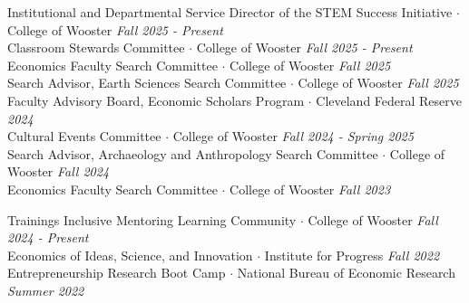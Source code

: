 \documentclass{resume} %
\begin{document}
\begin{rSection}{Institutional and Departmental Service}
	Director of the STEM Success Initiative $\cdot$ College of Wooster \hfill {\em Fall 2025 - Present} \\
	Classroom Stewards Committee $\cdot$ College of Wooster \hfill {\em Fall 2025 - Present} \\
	Economics Faculty Search Committee $\cdot$ College of Wooster \hfill {\em Fall 2025} \\
	Search Advisor, Earth Sciences Search Committee $\cdot$ College of Wooster \hfill {\em Fall 2025} \\
	Faculty Advisory Board, Economic Scholars Program $\cdot$ Cleveland Federal Reserve \hfill {\em 2024} \\
	Cultural Events Committee $\cdot$ College of Wooster \hfill {\em Fall 2024 - Spring 2025} \\
	Search Advisor, Archaeology and Anthropology Search Committee $\cdot$ College of Wooster \hfill {\em Fall 2024} \\
	Economics Faculty Search Committee $\cdot$ College of Wooster \hfill {\em Fall 2023}
\end{rSection}

\begin{rSection}{Trainings}
	Inclusive Mentoring Learning Community $\cdot$ College of Wooster \hfill {\em Fall 2024 - Present} \\
	Economics of Ideas, Science, and Innovation $\cdot$ Institute for Progress  \hfill {\em Fall 2022} \\
	Entrepreneurship Research Boot Camp $\cdot$ National Bureau of Economic Research \hfill {\em Summer 2022}
\end{rSection}

\end{document}
